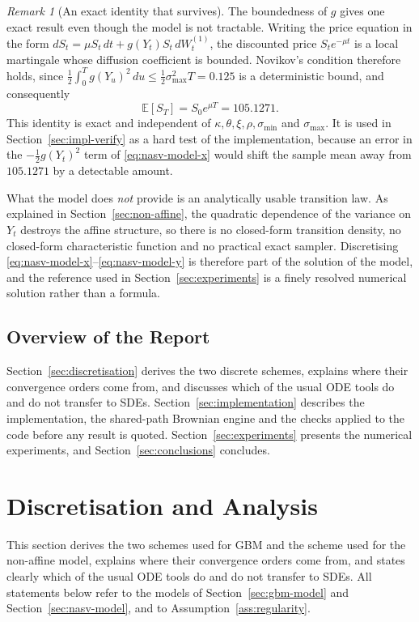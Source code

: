 \documentclass[11pt,a4paper]{article}
\theoremstyle{definition}
\theoremstyle{remark}
\newtheorem{remark}[theorem]{Remark}
\begin{document}
\begin{remark}[An exact identity that survives]
\label{rem:nasv-mean}
The boundedness of $g$ gives one exact result even though the model is not tractable. Writing the price equation in the form $dS_t = \mu S_t\, dt + g(Y_t) S_t\, dW_t^{(1)}$, the discounted price $S_t e^{-\mu t}$ is a local martingale whose diffusion coefficient is bounded. Novikov's condition therefore holds, since $\tfrac12 \int_0^T g(Y_u)^2\, du \le \tfrac12 \sigma_{\max}^2 T = 0.125$ is a deterministic bound, and consequently
\begin{equation}
    \mathbb{E}[S_T] = S_0 e^{\mu T} = 105.1271 .
    \label{eq:nasv-mean}
\end{equation}
This identity is exact and independent of $\kappa, \theta, \xi, \rho, \sigma_{\min}$ and $\sigma_{\max}$. It is used in Section~\ref{sec:impl-verify} as a hard test of the implementation, because an error in the $-\tfrac12 g(Y_t)^2$ term of \eqref{eq:nasv-model-x} would shift the sample mean away from $105.1271$ by a detectable amount.
\end{remark}
What the model does \emph{not} provide is an analytically usable transition law. As explained in Section~\ref{sec:non-affine}, the quadratic dependence of the variance on $Y_t$ destroys the affine structure, so there is no closed-form transition density, no closed-form characteristic function and no practical exact sampler. Discretising \eqref{eq:nasv-model-x}--\eqref{eq:nasv-model-y} is therefore part of the solution of the model, and the reference used in Section~\ref{sec:experiments} is a finely resolved numerical solution rather than a formula.
\subsection{Overview of the Report}
Section~\ref{sec:discretisation} derives the two discrete schemes, explains where their convergence orders come from, and discusses which of the usual ODE tools do and do not transfer to SDEs. Section~\ref{sec:implementation} describes the implementation, the shared-path Brownian engine and the checks applied to the code before any result is quoted. Section~\ref{sec:experiments} presents the numerical experiments, and Section~\ref{sec:conclusions} concludes.
\newpage

\newpage
\section{Discretisation and Analysis}
This section derives the two schemes used for GBM and the scheme used for the non-affine model, explains where their convergence orders come from, and states clearly which of the usual ODE tools do and do not transfer to SDEs. All statements below refer to the models of Section~\ref{sec:gbm-model} and Section~\ref{sec:nasv-model}, and to Assumption~\ref{ass:regularity}.
\end{document}
